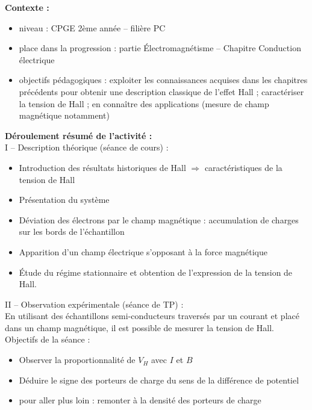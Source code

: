 \documentclass[a4paper,11pt]{article} %
\newenvironment{encart}[1]{%
	\begin{tcolorbox}
		[
		breakable, enhanced jigsaw, %
		arc = 1mm, %
		title = \textbf{#1}, %
		coltitle = white, %
		colbacktitle = blue, %
		colback = white, %
		colframe = blue %
		]
}{		
	\end{tcolorbox}
}
\begin{document}
	\begin{encart}{Activité pédagogique 1 : étude de l'effet Hall classique}
		\textbf{Contexte :}
		\begin{itemize}
			\item niveau : CPGE 2ème année -- filière PC
			\item place dans la progression : partie \'Electromagnétisme -- Chapitre Conduction électrique
			\item objectifs pédagogiques : exploiter les connaissances acquises dans les chapitres précédents pour obtenir une description classique de l'effet Hall ; caractériser la tension de Hall ; en connaître des applications (mesure de champ magnétique notamment)
		\end{itemize}
		\vspace{0.5cm}
		
		\textbf{Déroulement résumé de l'activité :}\\
		
		I -- Description théorique (séance de cours) :
		\begin{itemize}
			\item Introduction des résultats historiques de Hall $ \Rightarrow $ caractéristiques de la tension de Hall
			\item Présentation du système
			\item Déviation des électrons par le champ magnétique : accumulation de charges sur les bords de l'échantillon
			\item Apparition d'un champ électrique s'opposant à la force magnétique
			\item \'Etude du régime stationnaire et obtention de l'expression de la tension de Hall.
		\end{itemize}
		\vspace{0.5cm}
		
		II -- Observation expérimentale (séance de TP) :\\
		En utilisant des échantillons semi-conducteurs traversés par un courant et placé dans un champ magnétique, il est possible de mesurer la tension de Hall.\\
		Objectifs de la séance :
		\begin{itemize}
			\item Observer la proportionnalité de $ V_H $ avec $ I $ et $ B $
			\item Déduire le signe des porteurs de charge du sens de la différence de potentiel
			\item pour aller plus loin : remonter à la densité des porteurs de charge
		\end{itemize}
		

\end{encart}
\end{document}
